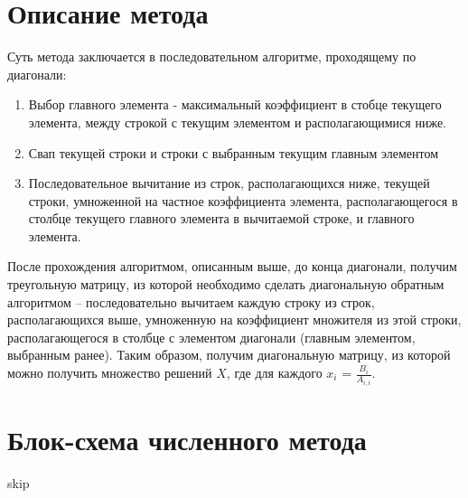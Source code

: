 \thispagestyle{empty}
\BgThispage
\section{Описание метода} \par
Суть метода заключается в последовательном алгоритме, проходящему по диагонали:
\begin{enumerate}
    \item Выбор главного элемента - максимальный коэффициент в стобце текущего элемента, между строкой с текущим элементом и располагающимися ниже.
    \item Свап текущей строки и строки с выбранным текущим главным элементом
    \item Последовательное вычитание из строк, располагающихся ниже, текущей строки, умноженной на частное коэффициента элемента, располагающегося в столбце текущего главного элемента в вычитаемой строке, и главного элемента.
\end{enumerate}
После прохождения алгоритмом, описанным выше, до конца диагонали, получим треугольную матрицу, из которой необходимо сделать диагональную обратным алгоритмом -- последовательно вычитаем каждую строку из строк, располагающихся выше, умноженную на коэффициент множителя из этой строки, располагающегося в столбце с элементом диагонали (главным элементом, выбранным ранее).
Таким образом, получим диагональную матрицу, из которой можно получить множество решений $X$, где для каждого $x_{i}$ = $\frac{B_{i}}{A_{i,i}}$.
\newpage
\thispagestyle{empty}
\BgThispage
\section{Блок-схема численного метода}
skip\\
\newpage
\thispagestyle{empty}
\BgThispage
